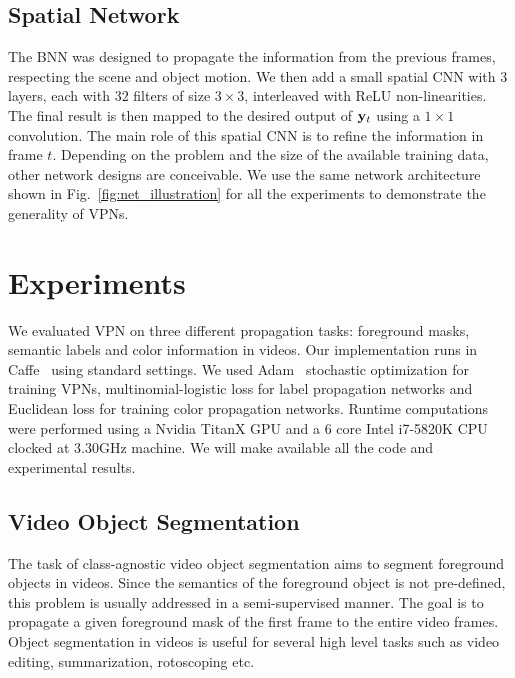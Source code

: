 \vspace{-0.1cm}
\subsection{Spatial Network}\label{sec:spatialcnn}

The BNN was designed to propagate the information from the previous frames, respecting the scene and object motion.
We then add a small spatial CNN with 3 layers, each with $32$ filters of size $3\times 3$,
interleaved with ReLU non-linearities.
The final result is then mapped to the desired output of $\mathbf{y}_t$ using a $1\times 1$
convolution.
The main role of this spatial CNN is to refine the information in frame $t$.
Depending on the problem and the size of the available training data, other network designs are
conceivable. We use the same network architecture shown in Fig.~\ref{fig:net_illustration}
for all the experiments to demonstrate the generality of VPNs.

\vspace{-0.1cm}
\section{Experiments}
\label{sec:exps}

We evaluated VPN on three different propagation tasks: foreground masks, semantic
labels and color information in videos. Our implementation runs in Caffe~\cite{jia2014caffe} using standard settings. We used Adam~\cite{kingma2014adam} stochastic optimization for training VPNs, multinomial-logistic loss for label propagation networks and Euclidean loss for training
color propagation networks. Runtime computations were performed using a
Nvidia TitanX GPU and a 6 core Intel i7-5820K CPU clocked at 3.30GHz machine.
We will make available all the code and experimental results.

\subsection{Video Object Segmentation}
\label{sec:videoseg}

The task of class-agnostic video object segmentation aims to segment foreground objects in
videos. Since the semantics of the foreground object is not pre-defined, this problem is
usually addressed in a semi-supervised manner. The goal is to propagate a
given foreground mask of the first frame to the entire video frames.
Object segmentation in videos is useful for several high level tasks such
as video editing, summarization, rotoscoping etc.

